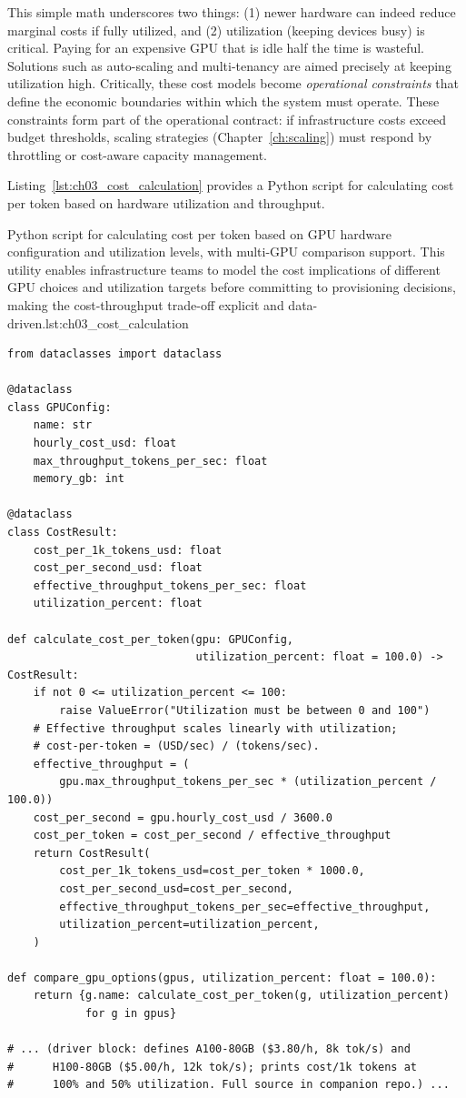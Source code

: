 This simple math underscores two things: (1) newer hardware can indeed reduce marginal costs if fully utilized, and (2) utilization (keeping devices busy) is critical. Paying for an expensive GPU that is idle half the time is wasteful. Solutions such as auto-scaling and multi-tenancy are aimed precisely at keeping utilization high. Critically, these cost models become \emph{operational constraints} that define the economic boundaries within which the system must operate. These constraints form part of the operational contract: if infrastructure costs exceed budget thresholds, scaling strategies (Chapter~\ref{ch:scaling}) must respond by throttling or cost-aware capacity management.

Listing~\ref{lst:ch03_cost_calculation} provides a Python script for calculating cost per token based on hardware utilization and throughput.

\begin{codebox}{Python script for calculating cost per token based on GPU hardware configuration and utilization levels, with multi-GPU comparison support. This utility enables infrastructure teams to model the cost implications of different GPU choices and utilization targets before committing to provisioning decisions, making the cost-throughput trade-off explicit and data-driven.}{lst:ch03_cost_calculation}
\begin{verbatim}
from dataclasses import dataclass

@dataclass
class GPUConfig:
    name: str
    hourly_cost_usd: float
    max_throughput_tokens_per_sec: float
    memory_gb: int

@dataclass
class CostResult:
    cost_per_1k_tokens_usd: float
    cost_per_second_usd: float
    effective_throughput_tokens_per_sec: float
    utilization_percent: float

def calculate_cost_per_token(gpu: GPUConfig,
                             utilization_percent: float = 100.0) -> CostResult:
    if not 0 <= utilization_percent <= 100:
        raise ValueError("Utilization must be between 0 and 100")
    # Effective throughput scales linearly with utilization;
    # cost-per-token = (USD/sec) / (tokens/sec).
    effective_throughput = (
        gpu.max_throughput_tokens_per_sec * (utilization_percent / 100.0))
    cost_per_second = gpu.hourly_cost_usd / 3600.0
    cost_per_token = cost_per_second / effective_throughput
    return CostResult(
        cost_per_1k_tokens_usd=cost_per_token * 1000.0,
        cost_per_second_usd=cost_per_second,
        effective_throughput_tokens_per_sec=effective_throughput,
        utilization_percent=utilization_percent,
    )

def compare_gpu_options(gpus, utilization_percent: float = 100.0):
    return {g.name: calculate_cost_per_token(g, utilization_percent)
            for g in gpus}

# ... (driver block: defines A100-80GB ($3.80/h, 8k tok/s) and
#      H100-80GB ($5.00/h, 12k tok/s); prints cost/1k tokens at
#      100% and 50% utilization. Full source in companion repo.) ...
\end{verbatim}
\end{codebox}

